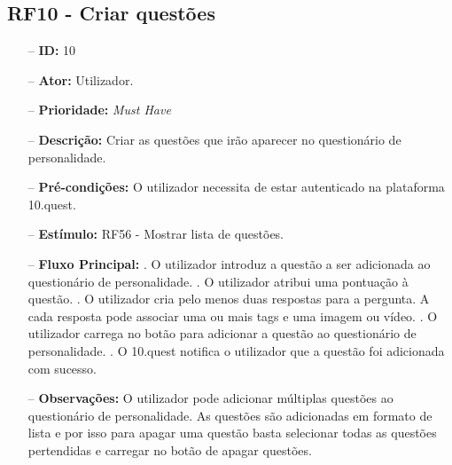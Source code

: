 \subsection{RF10 - Criar questões}
\begin{itemize}
	\item[--] \textbf{ID:} 10
	\item[--]  \textbf{Ator:} Utilizador.
	\item[--]  \textbf{Prioridade:} \textit{Must Have}
	\item[--]  \textbf{Descrição:} Criar as questões que irão aparecer no questionário de personalidade.
	\item[--]  \textbf{Pré-condições:} O utilizador necessita de estar autenticado na plataforma 10.quest.
	\item[--]  \textbf{Estímulo:}  
		\subitem RF56 - Mostrar lista de questões.
	\item[--]  \textbf{Fluxo Principal:} 
		. O utilizador introduz a questão a ser adicionada ao questionário de personalidade.
		. O utilizador atribui uma pontuação à questão.
		. O utilizador cria pelo menos duas respostas para a pergunta. A cada resposta pode associar uma ou mais tags e uma imagem ou vídeo.
		. O utilizador carrega no botão para adicionar a questão ao questionário de personalidade.
		. O 10.quest notifica o utilizador que a questão foi adicionada com sucesso.
	\item[--]  \textbf{Observações:} O utilizador pode adicionar múltiplas questões ao questionário de personalidade. As questões são adicionadas em formato de lista e por isso para apagar uma questão basta selecionar todas as questões pertendidas e carregar no botão de apagar questões.
\end{itemize}
\newpage

